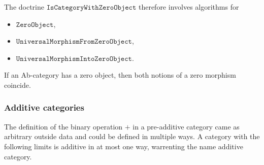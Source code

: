 \begin{doctrine}
The doctrine $\mathtt{IsCategoryWithZeroObject}$ therefore involves algorithms for
\begin{itemize}
 \item $\mathtt{ZeroObject}$,
 \item $\mathtt{UniversalMorphismFromZeroObject}$,
 \item $\mathtt{UniversalMorphismIntoZeroObject}$.
\end{itemize}
\end{doctrine}

If an Ab-category has a zero object, then both notions of a zero morphism coincide.

\subsubsection{Additive categories}
The definition of the binary operation $+$ in a pre-additive category came as arbitrary outside data and could be defined
in multiple ways. A category with the following limits is additive in at most one way, warrenting the name additive category.

